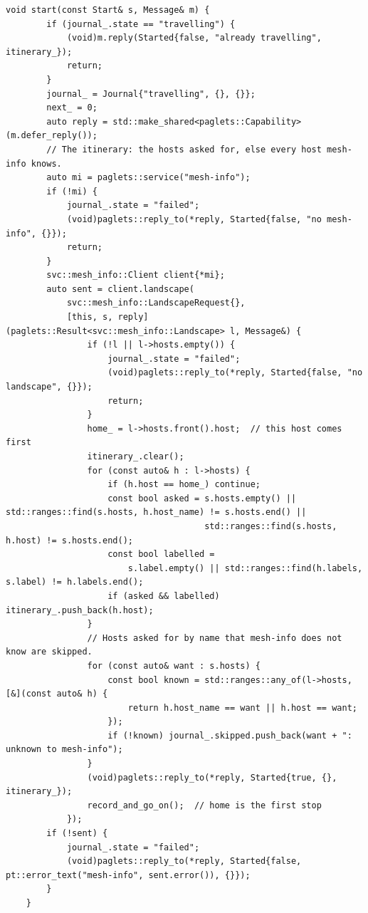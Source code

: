 \begin{lstlisting}[style=paglets-cpp,caption={The Mesh Journey \src{cpp/examples/journey/journey.cpp}},label={lst:app-journey}]
    void start(const Start& s, Message& m) {
        if (journal_.state == "travelling") {
            (void)m.reply(Started{false, "already travelling", itinerary_});
            return;
        }
        journal_ = Journal{"travelling", {}, {}};
        next_ = 0;
        auto reply = std::make_shared<paglets::Capability>(m.defer_reply());
        // The itinerary: the hosts asked for, else every host mesh-info knows.
        auto mi = paglets::service("mesh-info");
        if (!mi) {
            journal_.state = "failed";
            (void)paglets::reply_to(*reply, Started{false, "no mesh-info", {}});
            return;
        }
        svc::mesh_info::Client client{*mi};
        auto sent = client.landscape(
            svc::mesh_info::LandscapeRequest{},
            [this, s, reply](paglets::Result<svc::mesh_info::Landscape> l, Message&) {
                if (!l || l->hosts.empty()) {
                    journal_.state = "failed";
                    (void)paglets::reply_to(*reply, Started{false, "no landscape", {}});
                    return;
                }
                home_ = l->hosts.front().host;  // this host comes first
                itinerary_.clear();
                for (const auto& h : l->hosts) {
                    if (h.host == home_) continue;
                    const bool asked = s.hosts.empty() || std::ranges::find(s.hosts, h.host_name) != s.hosts.end() ||
                                       std::ranges::find(s.hosts, h.host) != s.hosts.end();
                    const bool labelled =
                        s.label.empty() || std::ranges::find(h.labels, s.label) != h.labels.end();
                    if (asked && labelled) itinerary_.push_back(h.host);
                }
                // Hosts asked for by name that mesh-info does not know are skipped.
                for (const auto& want : s.hosts) {
                    const bool known = std::ranges::any_of(l->hosts, [&](const auto& h) {
                        return h.host_name == want || h.host == want;
                    });
                    if (!known) journal_.skipped.push_back(want + ": unknown to mesh-info");
                }
                (void)paglets::reply_to(*reply, Started{true, {}, itinerary_});
                record_and_go_on();  // home is the first stop
            });
        if (!sent) {
            journal_.state = "failed";
            (void)paglets::reply_to(*reply, Started{false, pt::error_text("mesh-info", sent.error()), {}});
        }
    }


\end{lstlisting}
